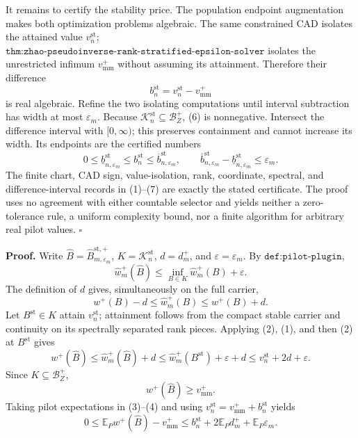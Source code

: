 It remains to certify the stability price.  The population endpoint augmentation makes both optimization problems algebraic.  The same constrained CAD isolates the attained value \(v_n^{\mathrm{st}}\); \(\texttt{thm:zhao-pseudoinverse-rank-stratified-epsilon-solver}\) isolates the unrestricted infimum \(v_{\mathrm{mm}}^+\) without assuming its attainment.  Therefore their difference
\[
b_n^{\mathrm{st}}=v_n^{\mathrm{st}}-v_{\mathrm{mm}}^+
\tag{6}
\]
is real algebraic.  Refine the two isolating computations until interval subtraction has width at most \(\varepsilon_m\).  Because \(\mathcal K_n^{\mathrm{st}}\subseteq\mathcal B_Z^+\), (6) is nonnegative.  Intersect the difference interval with \([0,\infty)\); this preserves containment and cannot increase its width.  Its endpoints are the certified numbers
\[
0\le\underline b_{n,\varepsilon_m}^{\mathrm{st}}
\le b_n^{\mathrm{st}}
\le\overline b_{n,\varepsilon_m}^{\mathrm{st}},
\qquad
\overline b_{n,\varepsilon_m}^{\mathrm{st}}
-\underline b_{n,\varepsilon_m}^{\mathrm{st}}\le\varepsilon_m.
\tag{7}
\]
The finite chart, CAD sign, value-isolation, rank, coordinate, spectral, and difference-interval records in (1)--(7) are exactly the stated certificate.  The proof uses no agreement with either countable selector and yields neither a zero-tolerance rule, a uniform complexity bound, nor a finite algorithm for arbitrary real pilot values. \(\square\)

\textbf{Proof.}
Write \(\widehat B=\widehat B_{m,\varepsilon_m}^{\mathrm{st},+}\), \(K=\mathcal K_n^{\mathrm{st}}\), \(d=d_m^+\), and \(\varepsilon=\varepsilon_m\).  By \(\texttt{def:pilot-plugin}\),
\[
\widehat w_m^+(\widehat B)
\le\inf_{B\in K}\widehat w_m^+(B)+\varepsilon.
\tag{1}
\]
The definition of \(d\) gives, simultaneously on the full carrier,
\[
w^+(B)-d\le\widehat w_m^+(B)\le w^+(B)+d.
\tag{2}
\]
Let \(B^{\mathrm{st}}\in K\) attain \(v_n^{\mathrm{st}}\); attainment follows from the compact stable carrier and continuity on its spectrally separated rank pieces.  Applying (2), (1), and then (2) at \(B^{\mathrm{st}}\) gives
\[
w^+(\widehat B)
\le\widehat w_m^+(\widehat B)+d
\le\widehat w_m^+(B^{\mathrm{st}})+\varepsilon+d
\le v_n^{\mathrm{st}}+2d+\varepsilon.
\tag{3}
\]
Since \(K\subseteq\mathcal B_Z^+\),
\[
w^+(\widehat B)\ge v_{\mathrm{mm}}^+.
\tag{4}
\]
Taking pilot expectations in (3)--(4) and using \(v_n^{\mathrm{st}}=v_{\mathrm{mm}}^++b_n^{\mathrm{st}}\) yields
\[
0\le\mathbb E_Pw^+(\widehat B)-v_{\mathrm{mm}}^+
\le b_n^{\mathrm{st}}+2\mathbb E_Pd_m^++\mathbb E_P\varepsilon_m.
\tag{5}
\]

